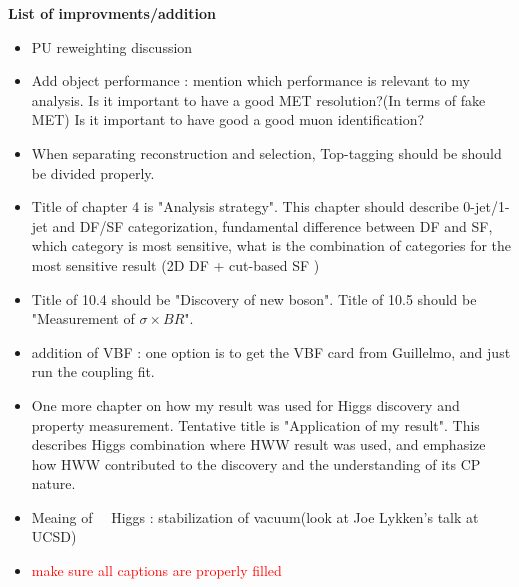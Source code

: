 
\begin{center}
\LARGE \textbf{List of improvments/addition}  \\
\end{center}
\vspace{1cm}

\normalsize
\begin{itemize}

\item 
PU reweighting discussion

\item 
Add object performance : mention which performance is relevant to my analysis. 
Is it important to have a good MET resolution?(In terms of fake MET) 
Is it important to have good a good muon identification? 

\item 
When separating reconstruction and selection, Top-tagging should be should be 
divided properly. 

\item 
Title of chapter 4 is "Analysis strategy". This chapter should describe 0-jet/1-jet 
and DF/SF categorization, fundamental difference between DF and SF, which category 
is most sensitive, what is the combination of categories for the most sensitive 
result (2D DF + cut-based SF  )

\item
Title of 10.4 should be "Discovery of new boson". 
Title of 10.5 should be "Measurement of $\sigma \times BR$". 

\item 
addition of VBF : one option is to get the VBF card from Guillelmo, 
and just run the coupling fit. 

\item 
One more chapter on how my result was used for Higgs discovery and property measurement. 
Tentative title is "Application of my result". This describes Higgs combination 
where HWW result was used, and emphasize how HWW contributed to the discovery and 
the understanding of its CP nature. 

\item 
Meaing of ~\GeV\ Higgs : stabilization of vacuum(look at Joe Lykken's talk at UCSD)

\item 
\textcolor{red}{make sure all captions are properly filled} 
\end{itemize}
